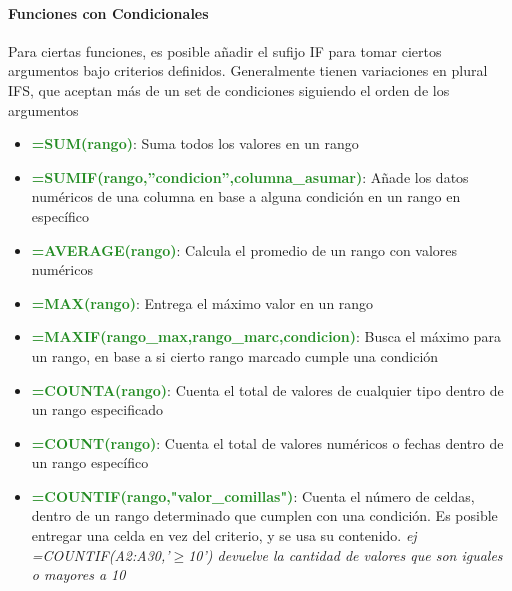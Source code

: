 \paragraph{Funciones con Condicionales}
Para ciertas funciones, es posible añadir el sufijo IF para tomar ciertos argumentos bajo criterios definidos. Generalmente tienen variaciones en plural IFS, que aceptan más de un set de condiciones siguiendo el orden de los argumentos
\begin{itemize}
    \item{\textcolor{ForestGreen}{\textbf{=SUM(rango)}}: Suma todos los valores en un rango}
    \item {\textcolor{ForestGreen}{\textbf{=SUMIF(rango,''condicion'',columna\_asumar)}}: Añade los datos numéricos de una columna en base a alguna condición en un rango en específico}
    \item {\textcolor{ForestGreen}{\textbf{=AVERAGE(rango)}}: Calcula el promedio de un rango con valores numéricos}
    \item {\textcolor{ForestGreen}{\textbf{=MAX(rango)}}: Entrega el máximo valor en un rango}
    \item {\textcolor{ForestGreen}{\textbf{=MAXIF(rango\_max,rango\_marc,condicion)}}: Busca el máximo para un rango, en base a si cierto rango marcado cumple una condición}
    \item {\textcolor{ForestGreen}{\textbf{=COUNTA(rango)}}: Cuenta el total de valores de cualquier tipo dentro de un rango especificado}
    \item {\textcolor{ForestGreen}{\textbf{=COUNT(rango)}}: Cuenta el total de valores numéricos o fechas dentro de un rango específico}
    \item {\textcolor{ForestGreen}{\textbf{=COUNTIF(rango,"valor\_comillas")}}: Cuenta el número de celdas, dentro de un rango determinado que cumplen con una condición. Es posible entregar una celda en vez del criterio, y se usa su contenido. \textit{ej =COUNTIF(A2:A30,'${\geq}$10') devuelve la cantidad de valores que son iguales o mayores a 10}}
\end{itemize}


